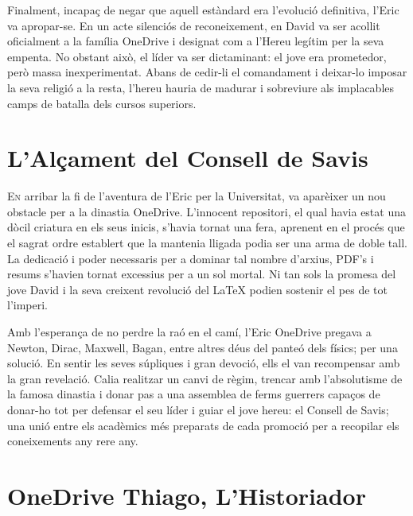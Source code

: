 Finalment, incapaç de negar que aquell estàndard era l'evolució definitiva, l'Eric va apropar-se. En un acte silenciós de reconeixement, en David va ser acollit oficialment a la família OneDrive i designat com a l'Hereu legítim per la seva empenta. No obstant això, el líder va ser dictaminant: el jove era prometedor, però massa inexperimentat. Abans de cedir-li el comandament i deixar-lo imposar la seva religió a la resta, l'hereu hauria de madurar i sobreviure als implacables camps de batalla dels cursos superiors.



\chapter{L'Alçament del Consell de Savis}


\lettrine[loversize=0.2, lines=2]{E}{n} arribar la fi de l'aventura de l'Eric per la Universitat, va aparèixer un nou obstacle per a la dinastia OneDrive. L'innocent repositori, el qual havia estat una dòcil criatura en els seus inicis, s'havia tornat una fera, aprenent en el procés que el sagrat ordre establert que la mantenia lligada podia ser una arma de doble tall. La dedicació i poder necessaris per a dominar tal nombre d'arxius, PDF's i resums s'havien tornat excessius per a un sol mortal. Ni tan sols la promesa del jove David i la seva creixent revolució del LaTeX podien sostenir el pes de tot l'imperi.

Amb l'esperança de no perdre la raó en el camí, l'Eric OneDrive pregava a Newton, Dirac, Maxwell, Bagan, entre altres déus del panteó dels físics; per una solució. En sentir les seves súpliques i gran devoció, ells el van recompensar amb la gran revelació. Calia realitzar un canvi de règim, trencar amb l'absolutisme de la famosa dinastia i donar pas a una assemblea de ferms guerrers capaços de donar-ho tot per defensar el seu líder i guiar el jove hereu: el Consell de Savis; una unió entre els acadèmics més preparats de cada promoció per a recopilar els coneixements any rere any.

\chapter{OneDrive Thiago, L'Historiador}

